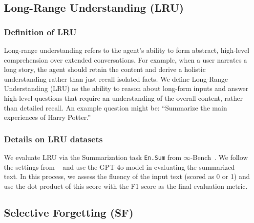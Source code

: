 \subsection{Long-Range Understanding (LRU)}

\subsubsection{Definition of LRU}
Long-range understanding refers to the agent’s ability to form abstract, high-level comprehension over extended conversations. For example, when a user narrates a long story, the agent should retain the content and derive a holistic understanding rather than just recall isolated facts.
We define Long-Range Understanding (LRU) as the ability to reason about long-form inputs and answer high-level questions that require an understanding of the overall content, rather than detailed recall. An example question might be: “Summarize the main experiences of Harry Potter.”

\subsubsection{Details on LRU datasets}

We evaluate LRU via the Summarization task \texttt{En.Sum} from $\infty$-Bench~\citep{infinitebench}. We follow the settings from ~\citep{HELMET} and use the GPT-4o model in evaluating the summarized text. In this process, we assess the fluency of the input text (scored as 0 or 1) and use the dot product of this score with the F1 score as the final evaluation metric.  




\subsection{Selective Forgetting (SF)}


